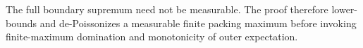 The full boundary supremum need not be measurable.  The proof therefore lower-bounds and de-Poissonizes a measurable finite packing maximum before invoking finite-maximum domination and monotonicity of outer expectation.